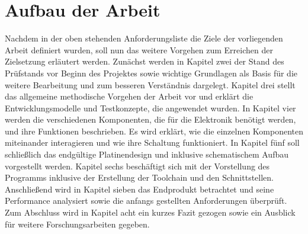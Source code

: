 \section{Aufbau der Arbeit}
Nachdem in der oben stehenden Anforderungsliste die Ziele der vorliegenden Arbeit definiert wurden, soll nun das weitere Vorgehen zum Erreichen der Zielsetzung erläutert werden. Zunächst werden in Kapitel zwei der Stand des Prüfstands vor Beginn des Projektes sowie wichtige Grundlagen als Basis für die weitere Bearbeitung und zum besseren Verständnis dargelegt. Kapitel drei stellt das allgemeine methodische Vorgehen der Arbeit vor und erklärt die Entwicklungsmodelle und Testkonzepte, die angewendet wurden.
In Kapitel vier werden die verschiedenen Komponenten, die für die Elektronik benötigt werden, und ihre Funktionen beschrieben. Es wird erklärt, wie die einzelnen Komponenten miteinander interagieren und wie ihre Schaltung funktioniert. 
In Kapitel fünf soll schließlich das endgültige Platinendesign und inklusive schematischem Aufbau vorgestellt werden.
Kapitel sechs beschäftigt sich mit der Vorstellung des Programms inklusive der Erstellung der Toolchain und den Schnittstellen.
Anschließend wird in Kapitel sieben das Endprodukt betrachtet und seine Performance analysiert sowie die anfangs gestellten Anforderungen überprüft. Zum Abschluss wird in Kapitel acht ein kurzes Fazit gezogen sowie ein Ausblick für weitere Forschungsarbeiten gegeben.